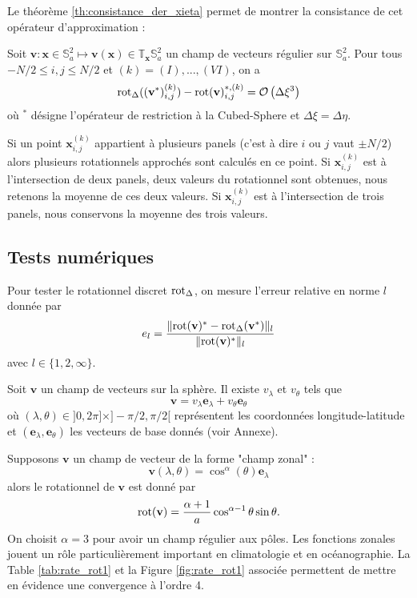 Le théorème \ref{th:consistance_der_xieta} permet de montrer la consistance de cet opérateur d'approximation :

\begin{proposition}
Soit $\mathbf{v} : \mathbf{x} \in \mathbb{S}_a^2 \mapsto \mathbf{v}(\mathbf{x}) \in \mathbb{T}_{\mathbf{x}} \mathbb{S}_a^2$ un champ de vecteurs régulier sur $\mathbb{S}_a^2$. Pour tous $-N/2 \leq i,j \leq N/2$ et $(k) = (I), ..., (VI)$, on a
\begin{equation}
\text{rot}_{\Delta}((\mathbf{v}^*)_{i,j}^{(k)}) - \text{rot}(\mathbf{v})^{*,(k)}_{i,j} = \mathcal{O} \left( \Delta \xi^3  \right) 
\end{equation}
où $^*$ désigne l'opérateur de restriction à la Cubed-Sphere et $\Delta \xi = \Delta \eta$.
\end{proposition}

Si un point $\mathbf{x}_{i,j}^{(k)}$ appartient à plusieurs panels (c'est à dire $i$ ou $j$ vaut $\pm N/2$) alors plusieurs rotationnels approchés sont calculés en ce point. Si $\mathbf{x}_{i,j}^{(k)}$ est à l'intersection de deux panels, deux valeurs du rotationnel sont obtenues, nous retenons la moyenne de ces deux valeurs. Si $\mathbf{x}_{i,j}^{(k)}$ est à l'intersection de trois panels, nous conservons la moyenne des trois valeurs.

\subsection{Tests numériques}

Pour tester le rotationnel discret $\text{rot}_{\Delta}$, on mesure l'erreur relative en norme $l$ donnée par
\begin{equation}
e_l = \dfrac{\| \text{rot}(\mathbf{v})^* - \text{rot}_{\Delta}(\mathbf{v}^*) \|_l}{\| \text{rot}(\mathbf{v})^* \|_l}
\end{equation}
avec $l \in \lbrace 1, 2, \infty \rbrace$.

Soit $\mathbf{v}$ un champ de vecteurs sur la sphère. Il existe $v_{\lambda}$ et $v_{\theta}$ tels que 
\begin{equation}
\mathbf{v} = v_{\lambda} \mathbf{e}_{\lambda} + v_{\theta} \mathbf{e}_{\theta}
\end{equation} 
où $(\lambda,\theta) \in ]0,2\pi]\times ]-\pi/2, \pi/2[$ représentent les coordonnées longitude-latitude et $(\mathbf{e}_{\lambda}, \mathbf{e}_{\theta})$ les vecteurs de base donnés (voir Annexe).

Supposons $\mathbf{v}$ un champ de vecteur de la forme "champ zonal" :
\begin{equation}
\mathbf{v}(\lambda, \theta) = \cos^{\alpha}(\theta) \mathbf{e}_{\lambda}
\label{eq:rot_test1}
\end{equation}
alors le rotationnel de $\mathbf{v}$ est donné par
\begin{equation}
\text{rot}(\mathbf{v}) = \dfrac{\alpha+1}{a} \cos^{\alpha-1} \theta \sin \theta .
\end{equation}
On choisit $\alpha = 3$ pour avoir un champ régulier aux pôles. Les fonctions zonales jouent un rôle particulièrement important en climatologie et en océanographie. La Table \ref{tab:rate_rot1} et la Figure \ref{fig:rate_rot1} associée permettent de mettre en évidence une convergence à l'ordre 4.


